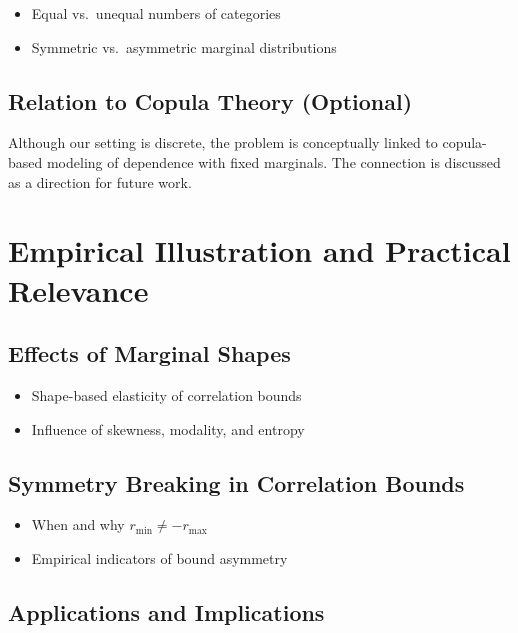 \documentclass[
  12pt,
]{article}
\providecommand{\tightlist}{%
  \setlength{\itemsep}{0pt}\setlength{\parskip}{0pt}}\usepackage{longtable,booktabs,array}
\begin{document}
\begin{itemize}
\tightlist
\item
  Equal vs.~unequal numbers of categories\\
\item
  Symmetric vs.~asymmetric marginal distributions
\end{itemize}

\subsection{Relation to Copula Theory
(Optional)}\label{relation-to-copula-theory-optional}

Although our setting is discrete, the problem is conceptually linked to
copula-based modeling of dependence with fixed marginals. The connection
is discussed as a direction for future work.

\section{Empirical Illustration and Practical
Relevance}\label{empirical-illustration-and-practical-relevance}

\subsection{Effects of Marginal
Shapes}\label{effects-of-marginal-shapes}

\begin{itemize}
\tightlist
\item
  Shape-based elasticity of correlation bounds\\
\item
  Influence of skewness, modality, and entropy
\end{itemize}

\subsection{Symmetry Breaking in Correlation
Bounds}\label{symmetry-breaking-in-correlation-bounds}

\begin{itemize}
\tightlist
\item
  When and why \(r_{\min} \neq -r_{\max}\)
\item
  Empirical indicators of bound asymmetry
\end{itemize}

\subsection{Applications and
Implications}\label{applications-and-implications}
\end{document}
